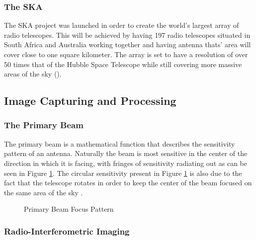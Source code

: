 \subsubsection{The SKA}
The SKA project was launched in order to create the world's largest array of radio telescopes. This will be achieved by having 197 radio telescopes situated in South Africa and Australia working together and having antenna thats' area will cover close to one square kilometer. The array is set to have a resolution of over 50 times that of the Hubble Space Telescope while still covering more massive areas of the sky (\cite{SKAsite}).
\subsection{Image Capturing and Processing}\label{ra:sec:ic}
%
\subsubsection{The Primary Beam}\label{ra:ssec:tpb}
The primary beam is a mathematical function that describes the sensitivity pattern of an antenna. Naturally the beam is most sensitive in the center of the direction in which it is facing, with fringes of sensitivity radiating out as can be seen in Figure \ref{ra:fig:beam}. The circular sensitivity present in Figure \ref{ra:fig:beam} is also due to the fact that the telescope rotates in order to keep the center of the beam focused on the same area of the sky \citep{oleg}.
%
\begin{figure}[H]
	\centering
	\caption{Primary Beam Focus Pattern \citep{oleg}}
	\label{ra:fig:beam}
\end{figure}
%
\subsubsection{Radio-Interferometric Imaging}\label{ra:ssec:rii}

%
